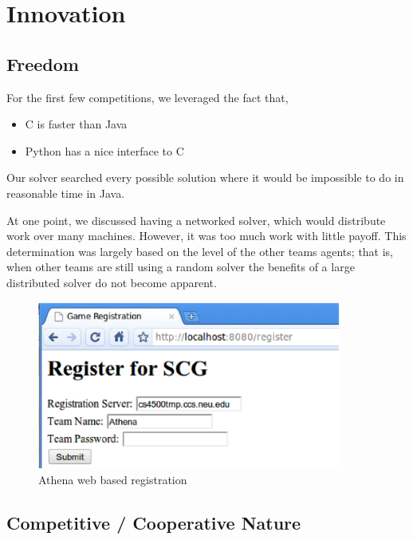 \documentclass[letterpaper,12pt,oneside]{article}
\begin{document}
\section{Innovation}

\subsection{Freedom}

For the first few competitions, we leveraged the fact that,
\begin{itemize}
\item C is faster than Java
\item Python has a nice interface to C
\end{itemize}
Our solver searched every possible solution where it would be impossible to
do in reasonable time in Java.

At one point, we discussed having a networked solver, which would
distribute work over many machines. However, it was too much work with
little payoff. This determination was largely based on the level of the other teams agents; that is, when other teams are still using a random solver the benefits of a large distributed solver do not become apparent.

\begin{figure}[htp]
\centering
\includegraphics[width=100mm]{registration.eps}
\caption{Athena web based registration}
\label{fig:registration}
\end{figure}

\subsection{Competitive / Cooperative Nature}
\end{document}
